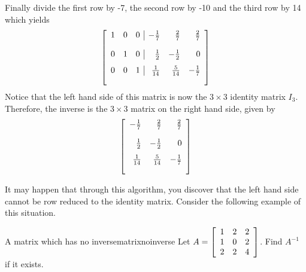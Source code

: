 \begin{solution}
Finally divide the first row by -7, the second row by -10 and the third row
by 14 which yields
\begin{equation*}
\leftB 
\begin{array}{rrr|rrr}
1 & 0 & 0 & -\vspace{0.05in}\frac{1}{7} & \vspace{0.05in}\frac{2}{7} & \vspace{0.05in}\frac{2}{7} \\
0 & 1 & 0 & \vspace{0.05in}\frac{1}{2} & -\vspace{0.05in}\frac{1}{2} & 0
\\
0 & 0 & 1 & \vspace{0.05in}\frac{1}{14} & \vspace{0.05in}\frac{5}{14} & -
\vspace{0.05in}\frac{1}{7}
\end{array}
\rightB 
\end{equation*}
Notice that the left hand side of this matrix is now the $3 \times 3$ identity matrix $I_3$. 
Therefore, the inverse is the $3 \times 3$ matrix on the right hand side, given by
\begin{equation*}
\leftB
\begin{array}{rrr}
-\vspace{0.05in}\frac{1}{7} & \vspace{0.05in}\frac{2}{7} & \vspace{0.05in}
\frac{2}{7} \\
\vspace{0.05in}\frac{1}{2} & -\vspace{0.05in}\frac{1}{2} & 0 \\
\vspace{0.05in}\frac{1}{14} & \vspace{0.05in}\frac{5}{14} & -\vspace{0.05in}
\frac{1}{7}
\end{array}
\rightB
\end{equation*}
\end{solution}

It may happen that through this algorithm, you discover that the left hand side cannot 
be row reduced to the identity matrix. Consider the following example of this situation. 

\begin{example}{A matrix which has no inverse}{matrixnoinverse}
Let $A=\left[
\begin{array}{rrr}
1 & 2 & 2 \\
1 & 0 & 2 \\
2 & 2 & 4
\end{array}
\right] $. Find $A^{-1}$ if it exists.
\end{example}

